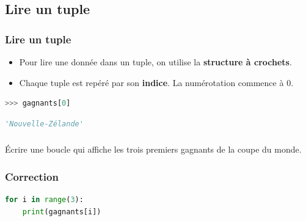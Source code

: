 \documentclass[svgnames,11pt]{beamer}
\begin{document}
\subsection{Lire un tuple}
\begin{frame}[fragile]
    \frametitle{Lire un tuple}

\begin{aretenir}[]
\begin{itemize}
    \item Pour lire une donnée dans un tuple, on utilise la \textbf{structure à crochets}. 
    \item Chaque tuple est repéré par son \textbf{indice}. La numérotation commence à 0.
\end{itemize}

\end{aretenir}
\begin{center}
\begin{lstlisting}[language=Python , basicstyle=\ttfamily\small, xleftmargin=2em, xrightmargin=2em]
>>> gagnants[0]
\end{lstlisting}
\label{CODE}
\end{center}
\begin{center}
\begin{lstlisting}[language=Python , basicstyle=\ttfamily\small, xleftmargin=2em, xrightmargin=2em]
'Nouvelle-Zélande'
\end{lstlisting}
\label{CODE}
\end{center}
\end{frame}
\begin{frame}
    \frametitle{}

    \begin{activite}
    Écrire une boucle qui affiche les trois premiers gagnants de la coupe du monde.
    \end{activite}

\end{frame}
\begin{frame}[fragile]
    \frametitle{Correction}

\begin{center}
\begin{lstlisting}[language=Python , basicstyle=\ttfamily\small, xleftmargin=2em, xrightmargin=2em]
for i in range(3):
    print(gagnants[i])
\end{lstlisting}
\label{CODE}
\end{center}

\end{frame}
\end{document}
